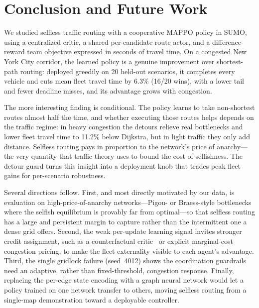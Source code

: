 \section{Conclusion and Future Work}
We studied selfless traffic routing with a cooperative MAPPO policy in SUMO, using a
centralized critic, a shared per-candidate route actor, and a difference-reward team
objective expressed in seconds of travel time. On a congested New York City corridor, the
learned policy is a genuine improvement over shortest-path routing: deployed greedily on
20 held-out scenarios, it completes every vehicle and cuts mean fleet travel time by 6.3\%
(16/20 wins), with a lower tail and fewer deadline misses, and its advantage grows with
congestion.

The more interesting finding is conditional. The policy learns to take non-shortest routes
almost half the time, and whether executing those routes helps depends on the traffic
regime: in heavy congestion the detours relieve real bottlenecks and lower fleet travel
time to 11.2\% below Dijkstra, but in light traffic they only add distance. Selfless
routing pays in proportion to the network's price of anarchy---the very quantity that
traffic theory uses to bound the cost of selfishness. The detour guard turns this insight
into a deployment knob that trades peak fleet gains for per-scenario robustness.

Several directions follow. First, and most directly motivated by our data, is evaluation
on high-price-of-anarchy networks---Pigou- or Braess-style bottlenecks where the selfish
equilibrium is provably far from optimal---so that selfless routing has a large and
persistent margin to capture rather than the intermittent one a dense grid offers. Second,
the weak per-update learning signal invites stronger credit assignment, such as a
counterfactual critic~\cite{foerster2018coma} or explicit marginal-cost congestion
pricing, to make the fleet externality visible to each agent's advantage. Third, the
single gridlock failure (seed~4012) shows the coordination guardrails need an adaptive,
rather than fixed-threshold, congestion response. Finally, replacing the per-edge state
encoding with a graph neural network would let a policy trained on one network transfer to
others, moving selfless routing from a single-map demonstration toward a deployable
controller.
